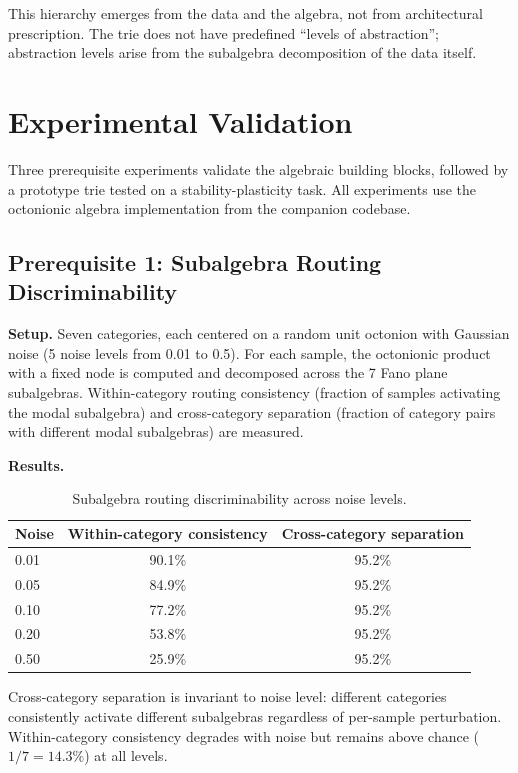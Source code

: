 \documentclass[11pt,a4paper]{article}
\theoremstyle{definition}
\theoremstyle{remark}
\begin{document}
This hierarchy emerges from the data and the algebra, not from architectural prescription. The trie does not have predefined ``levels of abstraction''; abstraction levels arise from the subalgebra decomposition of the data itself.

\section{Experimental Validation}
\label{sec:experiments}

Three prerequisite experiments validate the algebraic building blocks, followed by a prototype trie tested on a stability-plasticity task. All experiments use the octonionic algebra implementation from the companion codebase.

\subsection{Prerequisite 1: Subalgebra Routing Discriminability}

\textbf{Setup.} Seven categories, each centered on a random unit octonion with Gaussian noise (5 noise levels from 0.01 to 0.5). For each sample, the octonionic product with a fixed node is computed and decomposed across the 7 Fano plane subalgebras. Within-category routing consistency (fraction of samples activating the modal subalgebra) and cross-category separation (fraction of category pairs with different modal subalgebras) are measured.

\textbf{Results.}

\begin{table}[ht]
\centering
\caption{Subalgebra routing discriminability across noise levels.}
\label{tab:routing}
\begin{tabular}{@{}lcc@{}}
\toprule
Noise & Within-category consistency & Cross-category separation \\
\midrule
0.01 & 90.1\% & 95.2\% \\
0.05 & 84.9\% & 95.2\% \\
0.10 & 77.2\% & 95.2\% \\
0.20 & 53.8\% & 95.2\% \\
0.50 & 25.9\% & 95.2\% \\
\bottomrule
\end{tabular}
\end{table}

Cross-category separation is invariant to noise level: different categories consistently activate different subalgebras regardless of per-sample perturbation. Within-category consistency degrades with noise but remains above chance ($1/7 = 14.3\%$) at all levels.
\end{document}
